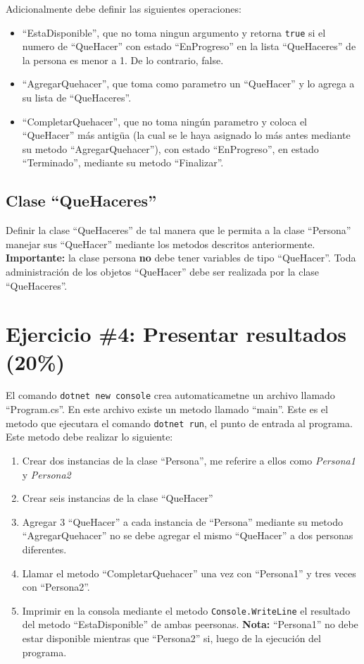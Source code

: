 \documentclass{article}
\begin{document}
Adicionalmente debe definir las siguientes operaciones:
\begin{itemize}
        \item{``EstaDisponible'', que no toma ningun argumento y retorna \texttt{true}
                si el numero de ``QueHacer'' con estado ``EnProgreso'' en la lista
                ``QueHaceres'' de la persona es menor a 1. De lo contrario, false.}
        \item{``AgregarQuehacer'', que toma como parametro un ``QueHacer'' y lo agrega a su
                lista de ``QueHaceres''}.
        \item{``CompletarQuehacer'', que no toma ning\'un parametro y coloca el ``QueHacer''
                m\'as antig\"ua (la cual se le haya asignado lo m\'as antes mediante
                su metodo ``AgregarQuehacer''), con estado ``EnProgreso'', en estado
                ``Terminado'', mediante su metodo ``Finalizar''.} 
\end{itemize}

\subsection*{Clase ``QueHaceres''}
Definir la clase ``QueHaceres'' de tal manera que le permita a la clase ``Persona''
manejar sus ``QueHacer'' mediante los metodos descritos anteriormente. {\bf Importante:}
la clase persona {\bf no} debe tener variables de tipo ``QueHacer''. Toda administraci\'on
de los objetos ``QueHacer'' debe ser realizada por la clase ``QueHaceres''.

\section*{Ejercicio \#4: Presentar resultados (20\%)}
El comando \texttt{dotnet new console} crea automaticametne un archivo llamado
``Program.cs''. En este archivo existe un metodo llamado ``main''. Este es el
metodo que ejecutara el comando \texttt{dotnet run}, el punto de entrada al
programa. Este metodo debe realizar lo siguiente:
\begin{enumerate}
        \item{Crear dos instancias de la clase ``Persona'', me referire a ellos
                como \emph{Persona1} y \emph{Persona2}}
        \item{Crear seis instancias de la clase ``QueHacer''}
        \item{Agregar 3 ``QueHacer'' a cada instancia de ``Persona'' mediante
                su metodo ``AgregarQuehacer'' no se debe agregar el mismo
                ``QueHacer'' a dos personas diferentes.}
        \item{Llamar el metodo ``CompletarQuehacer'' una vez con ``Persona1''
                y tres veces con ``Persona2''.}
        \item{Imprimir en la consola mediante el metodo \texttt{Console.WriteLine}
                el resultado del metodo ``EstaDisponible'' de ambas peersonas.
                {\bf Nota:} ``Persona1'' no debe estar disponible mientras que
                ``Persona2'' si, luego de la ejecuci\'on del programa.}
\end{enumerate}
\end{document}
